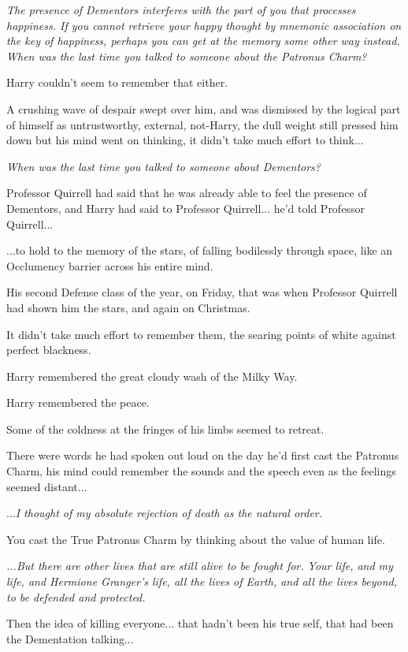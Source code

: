 \emph{The presence of Dementors interferes with the part of you that
processes happiness. If you cannot retrieve your happy thought by
mnemonic association on the key of happiness, perhaps you can get at the
memory some other way instead. When was the last time you talked to
someone about the Patronus Charm?}

Harry couldn't seem to remember that either.

A crushing wave of despair swept over him, and was dismissed by the
logical part of himself as untrustworthy, external, not-Harry, the dull
weight still pressed him down but his mind went on thinking, it didn't
take much effort to think...

\emph{When was the last time you talked to someone about Dementors?}

Professor Quirrell had said that he was already able to feel the
presence of Dementors, and Harry had said to Professor Quirrell...
he'd told Professor Quirrell...

...to hold to the memory of the stars, of falling bodilessly
through space, like an Occlumency barrier across his entire mind.

His second Defense class of the year, on Friday, that was when Professor
Quirrell had shown him the stars, and again on Christmas.

It didn't take much effort to remember them, the searing points of white
against perfect blackness.

Harry remembered the great cloudy wash of the Milky Way.

Harry remembered the peace.

Some of the coldness at the fringes of his limbs seemed to retreat.

There were words he had spoken out loud on the day he'd first cast the
Patronus Charm, his mind could remember the sounds and the speech even
as the feelings seemed distant...

...\emph{I thought of my absolute rejection of death as the natural
order.}

You cast the True Patronus Charm by thinking about the value of human
life.

\emph{...But there are other lives that are still alive to be
fought for. Your life, and my life, and Hermione Granger's life, all the
lives of Earth, and all the lives beyond, to be defended and protected.}

Then the idea of killing everyone... that hadn't been his true
self, that had been the Dementation talking...

